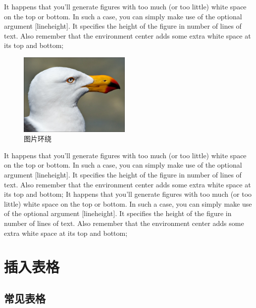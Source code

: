 \documentclass[fancyhdr,adobefonts,oneside,hyperref,openany,a4paper,UTF8]{ctexbook}
\begin{document}
It happens that you'll generate figures with too much (or too little) white space on the top or bottom. In such a case, you can simply make use of the optional argument [lineheight]. It specifies the height of the figure in number of lines of text. Also remember that the environment center adds some extra white space at its top and bottom;

\begin{figure}
  \vspace{-20pt}
  \begin{center}
    \includegraphics[width=0.48\textwidth]{img/gull}
  \end{center}
  \vspace{-20pt}
  \caption{图片环绕}
  \vspace{-10pt}
\end{figure}
It happens that you'll generate figures with too much (or too little) white space on the top or bottom. In such a case, you can simply make use of the optional argument [lineheight]. It specifies the height of the figure in number of lines of text. Also remember that the environment center adds some extra white space at its top and bottom;
It happens that you'll generate figures with too much (or too little) white space on the top or bottom. In such a case, you can simply make use of the optional argument [lineheight]. It specifies the height of the figure in number of lines of text. Also remember that the environment center adds some extra white space at its top and bottom;

\chapter{插入表格}
\section{常见表格}
\end{document}
